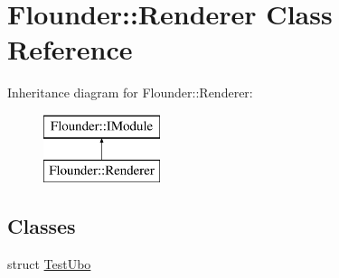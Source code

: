 \hypertarget{class_flounder_1_1_renderer}{}\section{Flounder\+:\+:Renderer Class Reference}
\label{class_flounder_1_1_renderer}
Inheritance diagram for Flounder\+:\+:Renderer\+:\begin{figure}[H]
\begin{center}
\leavevmode
\includegraphics[height=2.000000cm]{class_flounder_1_1_renderer}
\end{center}
\end{figure}
\subsection*{Classes}
\begin{DoxyCompactItemize}
\item 
struct \hyperlink{struct_flounder_1_1_renderer_1_1_test_ubo}{Test\+Ubo}
\end{DoxyCompactItemize}
